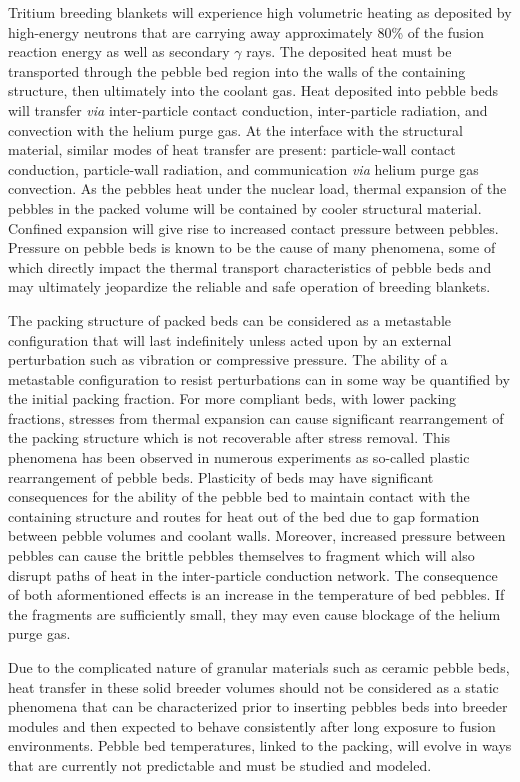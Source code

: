 \documentclass[11pt]{report} %
\begin{document}
Tritium breeding blankets will experience high volumetric heating as deposited by high-energy neutrons that are carrying away approximately 80\% of the fusion reaction energy as well as secondary $\gamma$ rays. The deposited heat must be transported through the pebble bed region into the walls of the containing structure, then ultimately into the coolant gas. Heat deposited into pebble beds will transfer \textit{via} inter-particle contact conduction, inter-particle radiation, and convection with the helium purge gas. At the interface with the structural material, similar modes of heat transfer are present: particle-wall contact conduction, particle-wall radiation, and communication \textit{via} helium purge gas convection. As the pebbles heat under the nuclear load, thermal expansion of the pebbles in the packed volume will be contained by cooler structural material. Confined expansion will give rise to increased contact pressure between pebbles. Pressure on pebble beds is known to be the cause of many phenomena, some of which directly impact the thermal transport characteristics of pebble beds and may ultimately jeopardize the reliable and safe operation of breeding blankets. 

The packing structure of packed beds can be considered as a metastable configuration that will last indefinitely unless acted upon by an external perturbation such as vibration or compressive pressure.\cite{Jaeger1996} The ability of a metastable configuration to resist perturbations can in some way be quantified by the initial packing fraction. For more compliant beds, with lower packing fractions, stresses from thermal expansion can cause significant rearrangement of the packing structure which is not recoverable after stress removal. This phenomena has been observed in numerous experiments as so-called plastic rearrangement of pebble beds.\cite{Reimann:2002kl,Reimann:2000tw,Zhang2015} Plasticity of beds may have significant consequences for the ability of the pebble bed to maintain contact with the containing structure and routes for heat out of the bed due to gap formation between pebble volumes and coolant walls. Moreover, increased pressure between pebbles can cause the brittle pebbles themselves to fragment which will also disrupt paths of heat in the inter-particle conduction network. The consequence of both aformentioned effects is an increase in the temperature of bed pebbles. If the fragments are sufficiently small, they may even cause blockage of the helium purge gas. 

Due to the complicated nature of granular materials such as ceramic pebble beds, heat transfer in these solid breeder volumes should not be considered as a static phenomena that can be characterized prior to inserting pebbles beds into breeder modules and then expected to behave consistently after long exposure to fusion environments. Pebble bed temperatures, linked to the packing, will evolve in ways that are currently not predictable and must be studied and modeled.
\end{document}
